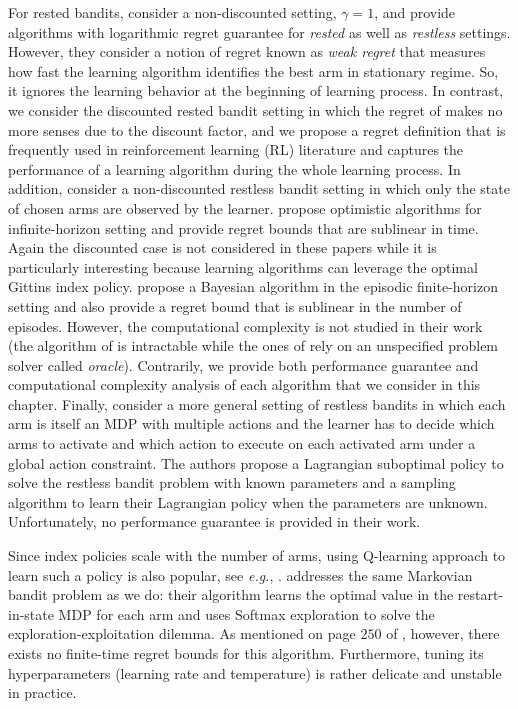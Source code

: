 For rested bandits, \cite{tekin2012online} consider a non-discounted setting, $\gamma=1$, and provide algorithms with logarithmic regret guarantee for \emph{rested}  as well as  \emph{restless} settings.
However, they consider a notion of regret known as \emph{weak regret} that measures how fast the learning algorithm identifies the best arm in stationary regime. So, it ignores the learning behavior at the beginning of learning process.
In contrast, we consider the discounted rested bandit setting in which the regret of \cite{tekin2012online} makes no more senses due to the discount factor, and we propose a regret definition that is frequently used in reinforcement learning (RL) literature and captures the performance of a learning algorithm during the whole learning process.
In addition, \cite{ortner2012regret, jung2019regret, wang2020restless} consider a non-discounted restless bandit setting in which only the state of chosen arms are observed by the learner. \cite{ortner2012regret, wang2020restless} propose optimistic algorithms for infinite-horizon setting and provide regret bounds that are sublinear in time. Again the discounted case is not considered in these papers while it is particularly interesting  because learning algorithms can leverage the optimal Gittins index policy.
\cite{jung2019regret} propose a Bayesian algorithm in the episodic finite-horizon setting and also provide a regret bound that is sublinear in the number of episodes. However, the computational complexity is not studied in their work (the algorithm of \cite{ortner2012regret} is intractable while the ones of \cite{jung2019regret, wang2020restless} rely on an unspecified problem solver called \emph{oracle}).
Contrarily, we provide both performance guarantee and computational complexity analysis of each algorithm that we consider in this chapter.
Finally, \cite{killian2021beyond} consider a more general setting of restless bandits in which each arm is itself an MDP with multiple actions and the learner has to decide which arms to activate and which action to execute on each activated arm under a  global action constraint. The authors propose a Lagrangian suboptimal policy to solve the restless bandit problem with known parameters and a sampling algorithm to learn their Lagrangian policy when the parameters are unknown. Unfortunately, no performance guarantee is provided in their work.

Since index policies  scale with the number of arms, using Q-learning approach
to learn such a policy is also popular, see \emph{e.g.},
\cite{avrachenkov2022whittle,fu2019towards,duff1995q}. \cite{duff1995q} addresses the same Markovian bandit
problem as we do: their algorithm learns the optimal value in the
restart-in-state MDP \cite{katehakis1987multi} for each
arm and uses Softmax exploration to solve the exploration-exploitation
dilemma. As mentioned on page $250$ of
\cite{auer2002finite}, however, there exists no
finite-time regret bounds for this algorithm. Furthermore, tuning
its hyperparameters (learning rate and temperature) is rather delicate and
unstable in practice. 

